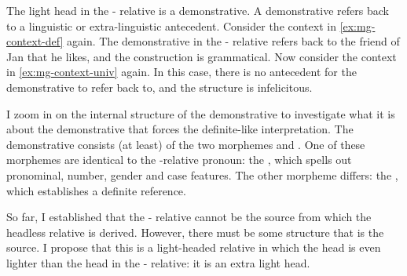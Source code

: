The light head in the - relative is a demonstrative. A demonstrative refers back to a linguistic or extra-linguistic antecedent. Consider the context in \ref{ex:mg-context-def} again. The demonstrative  in the - relative refers back to the friend of Jan that he likes, and the construction is grammatical. Now consider the context in \ref{ex:mg-context-univ} again. In this case, there is no antecedent for the demonstrative  to refer back to, and the structure is infelicitous.

I zoom in on the internal structure of the demonstrative  to investigate what it is about the demonstrative that forces the definite-like interpretation. The demonstrative consists (at least) of the two morphemes  and . One of these morphemes are identical to the -relative pronoun: the , which spells out pronominal, number, gender and case features. The other morpheme differs: the , which establishes a definite reference.

So far, I established that the - relative cannot be the source from which the headless relative is derived. However, there must be some structure that is the source. I propose that this is a light-headed relative in which the head is even lighter than the head in the - relative: it is an extra light head.

